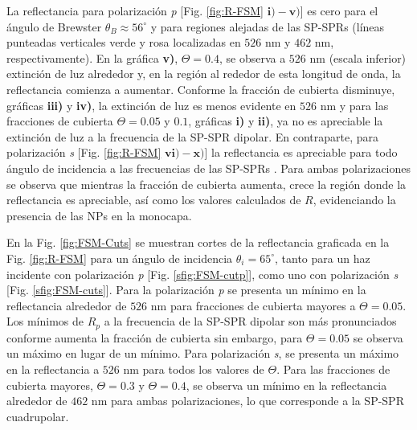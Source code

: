 La reflectancia para polarización \emph{p} [Fig. \ref{fig:R-FSM} $\mathbf{i)-v)}$] es cero para el ángulo de Brewster $\theta_B \approx 56^\circ$ y para regiones alejadas de las SP-SPRs (líneas punteadas verticales verde y rosa  localizadas en $526$ nm y $462$ nm, respectivamente). En la gráfica \textbf{v)}, $\Theta=0.4$,  se observa a $526$ nm (escala inferior) extinción de luz alrededor y, en la región al rededor de esta longitud de onda, la reflectancia comienza a aumentar. Conforme la fracción de cubierta disminuye, gráficas \textbf{iii)} y \textbf{iv)}, la extinción de luz es  menos evidente en $526$ nm y para las fracciones de cubierta $\Theta=0.05$ y $0.1$, gráficas \textbf{i)} y \textbf{ii)}, ya no es apreciable la extinción de luz a la frecuencia de la SP-SPR dipolar. En contraparte, para polarización \emph{s} [Fig. \ref{fig:R-FSM} $\mathbf{vi)-x)}$] la reflectancia es apreciable para todo ángulo de incidencia a las frecuencias de las SP-SPRs . Para ambas polarizaciones se observa que mientras la fracción de cubierta aumenta,  crece la región donde la reflectancia es apreciable, así como los valores calculados de $R$, evidenciando la presencia de las NPs en la monocapa.

En la Fig. \ref{fig:FSM-Cuts} se muestran cortes de la reflectancia graficada en la Fig. \ref{fig:R-FSM} para un ángulo de incidencia $\theta_i = 65^\circ$, tanto para un haz incidente con polarización \emph{p} [Fig. \ref{sfig:FSM-cutp}], como uno con polarización \emph{s} [Fig. \ref{sfig:FSM-cuts}]. Para la polarización \emph{p} se presenta un mínimo en la reflectancia alrededor de $526$ nm para fracciones de cubierta mayores a $\Theta = 0.05$. Los mínimos de $R_p$ a la frecuencia de la SP-SPR dipolar son más pronunciados conforme aumenta la fracción de cubierta sin embargo, para $\Theta=0.05$ se observa un máximo en lugar de un mínimo. Para polarización \emph{s}, se presenta un máximo en la reflectancia a $526$ nm para todos los valores de $\Theta$. Para las fracciones de cubierta mayores, $\Theta = 0.3$ y $\Theta = 0.4$,  se observa un  mínimo en la reflectancia alrededor de $462$ nm para ambas polarizaciones, lo que corresponde a la SP-SPR cuadrupolar.

